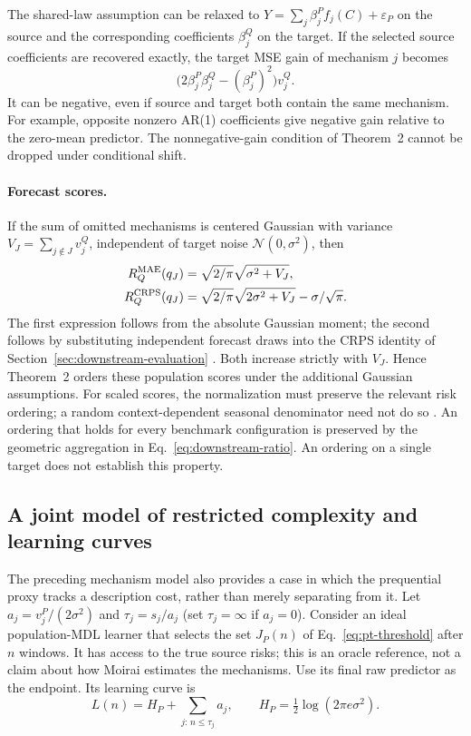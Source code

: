 \documentclass[10pt,a4paper]{article}
\theoremstyle{definition}
\begin{document}
The shared-law assumption can be relaxed to
$Y=\sum_j\beta_j^P f_j(C)+\varepsilon_P$ on the source and the
corresponding coefficients $\beta_j^Q$ on the target. If the
selected source coefficients are recovered exactly, the target MSE
gain of mechanism $j$ becomes
\[
 \bigl(2\beta_j^P\beta_j^Q-(\beta_j^P)^2\bigr)v_j^Q.
\]
It can be negative, even if source and target both contain the
same mechanism. For example, opposite nonzero AR(1) coefficients
give negative gain relative to the zero-mean predictor. The
nonnegative-gain condition of Theorem~2 cannot be dropped under
conditional shift.

\paragraph{Forecast scores.}
If the sum of omitted mechanisms is centered Gaussian with
variance $V_J=\sum_{j\notin J}v_j^Q$, independent of target noise
$\mathcal N(0,\sigma^2)$, then
\[
 \begin{aligned}
 R_Q^{\rm MAE}(q_J)&=\sqrt{2/\pi}\sqrt{\sigma^2+V_J},\\
 R_Q^{\rm CRPS}(q_J)&=\sqrt{2/\pi}\sqrt{2\sigma^2+V_J}
                         -\sigma/\sqrt{\pi}.
 \end{aligned}
\]
The first expression follows from the absolute Gaussian moment;
the second follows by substituting independent forecast draws
into the CRPS identity of Section~\ref{sec:downstream-evaluation}
\cite{gneiting2007}. Both increase strictly with $V_J$.
Hence Theorem~2 orders these population scores under the additional
Gaussian assumptions. For scaled scores, the normalization must
preserve the relevant risk ordering; a random context-dependent
seasonal denominator need not do so \cite{hyndman2006}.
An ordering that holds for every benchmark configuration is preserved
by the geometric aggregation in Eq.~\eqref{eq:downstream-ratio}.
An ordering on a single target does not establish this property.

\subsection{A joint model of restricted complexity and learning curves}
\label{sec:pt-joint}

The preceding mechanism model also provides a case in which the
prequential proxy tracks a description cost, rather than merely
separating from it. Let $a_j=v_j^P/(2\sigma^2)$ and
$\tau_j=s_j/a_j$ (set $\tau_j=\infty$ if $a_j=0$).
Consider an ideal population-MDL learner that selects the set
$J_P(n)$ of Eq.~\eqref{eq:pt-threshold} after $n$ windows.
It has access to the true source risks; this is an oracle reference,
not a claim about how Moirai estimates the mechanisms.
Use its final raw predictor as the endpoint. Its learning curve is
\[
 L(n)=H_P+\sum_{j:\,n\leq\tau_j}a_j,\qquad
 H_P=\tfrac12\log(2\pi e\sigma^2).
\]
\end{document}
